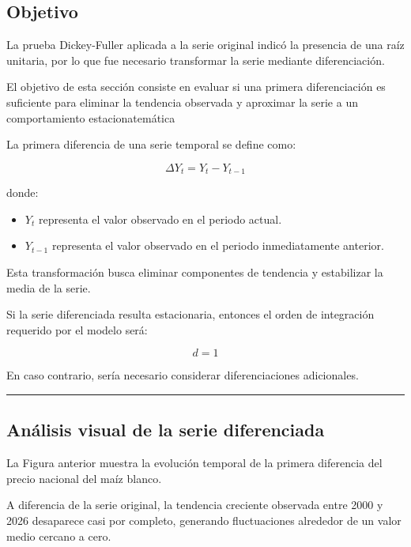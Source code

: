 \documentclass[11pt]{article}
\providecommand{\tightlist}{%
      \setlength{\itemsep}{0pt}\setlength{\parskip}{0pt}}
\begin{document}
\hypertarget{objetivo}{%
\subsection{Objetivo}\label{objetivo}}

La prueba Dickey-Fuller aplicada a la serie original indicó la presencia
de una raíz unitaria, por lo que fue necesario transformar la serie
mediante diferenciación.

El objetivo de esta sección consiste en evaluar si una primera
diferenciación es suficiente para eliminar la tendencia observada y
aproximar la serie a un comportamiento estacionatemática

La primera diferencia de una serie temporal se define como:

\[
\Delta Y_t = Y_t - Y_{t-1}
\]

donde:

\begin{itemize}
\tightlist
\item
  \(Y_t\) representa el valor observado en el periodo actual.
\item
  \(Y_{t-1}\) representa el valor observado en el periodo inmediatamente
  anterior.
\end{itemize}

Esta transformación busca eliminar componentes de tendencia y
estabilizar la media de la serie.

Si la serie diferenciada resulta estacionaria, entonces el orden de
integración requerido por el modelo será:

\[
d = 1
\]

En caso contrario, sería necesario considerar diferenciaciones
adicionales.

\begin{center}\rule{0.5\linewidth}{0.5pt}\end{center}

\hypertarget{anuxe1lisis-visual-de-la-serie-diferenciada}{%
\subsection{Análisis visual de la serie
diferenciada}\label{anuxe1lisis-visual-de-la-serie-diferenciada}}

La Figura anterior muestra la evolución temporal de la primera
diferencia del precio nacional del maíz blanco.

A diferencia de la serie original, la tendencia creciente observada
entre 2000 y 2026 desaparece casi por completo, generando fluctuaciones
alrededor de un valor medio cercano a cero.
\end{document}
